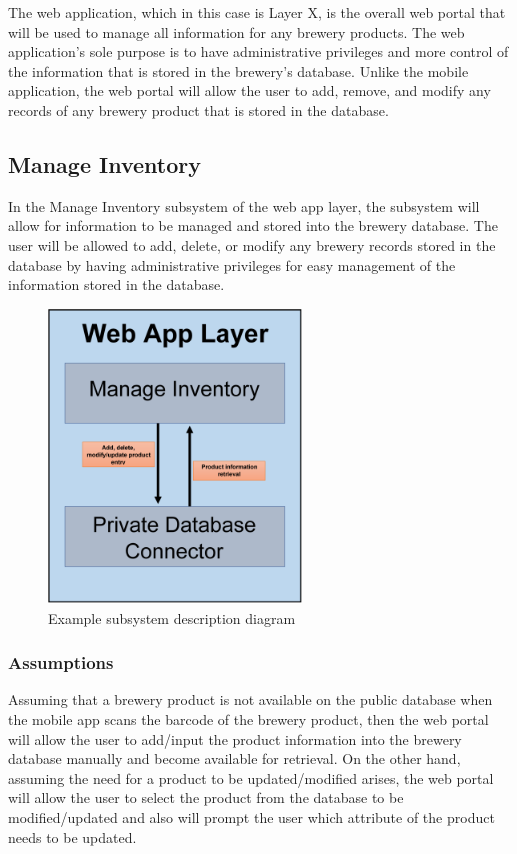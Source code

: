 The web application, which in this case is Layer X, is the overall web portal that will be used to manage all information for any brewery products.  The web application's sole purpose is to have administrative privileges and more control of the information that is stored in the brewery's database.  Unlike the mobile application, the web portal will allow the user to add, remove, and modify any records of any brewery product that is stored in the database.

\subsection{Manage Inventory}
In the Manage Inventory subsystem of the web app layer, the subsystem will allow for information to be managed and stored into the brewery database.  The user will be allowed to add, delete, or modify any brewery records stored in the database by having administrative privileges for easy management of the information stored in the database.

\begin{figure}[h!]
	\centering
 	\includegraphics[width=0.60\textwidth]{images/web_app_layer.png}
 \caption{Example subsystem description diagram}
\end{figure}

\subsubsection{Assumptions}
Assuming that a brewery product is not available on the public database when the mobile app scans the barcode of the brewery product, then the web portal will allow the user to add/input the product information into the brewery database manually and become available for retrieval.  On the other hand, assuming the need for a product to be updated/modified arises, the web portal will allow the user to select the product from the database to be modified/updated and also will prompt the user which attribute of the product needs to be updated.

